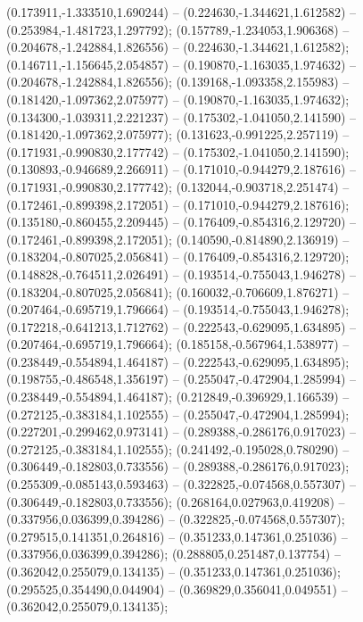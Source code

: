  (0.173911,-1.333510,1.690244) -- (0.224630,-1.344621,1.612582) -- (0.253984,-1.481723,1.297792);
 (0.157789,-1.234053,1.906368) -- (0.204678,-1.242884,1.826556) -- (0.224630,-1.344621,1.612582);
 (0.146711,-1.156645,2.054857) -- (0.190870,-1.163035,1.974632) -- (0.204678,-1.242884,1.826556);
 (0.139168,-1.093358,2.155983) -- (0.181420,-1.097362,2.075977) -- (0.190870,-1.163035,1.974632);
 (0.134300,-1.039311,2.221237) -- (0.175302,-1.041050,2.141590) -- (0.181420,-1.097362,2.075977);
 (0.131623,-0.991225,2.257119) -- (0.171931,-0.990830,2.177742) -- (0.175302,-1.041050,2.141590);
 (0.130893,-0.946689,2.266911) -- (0.171010,-0.944279,2.187616) -- (0.171931,-0.990830,2.177742);
 (0.132044,-0.903718,2.251474) -- (0.172461,-0.899398,2.172051) -- (0.171010,-0.944279,2.187616);
 (0.135180,-0.860455,2.209445) -- (0.176409,-0.854316,2.129720) -- (0.172461,-0.899398,2.172051);
 (0.140590,-0.814890,2.136919) -- (0.183204,-0.807025,2.056841) -- (0.176409,-0.854316,2.129720);
 (0.148828,-0.764511,2.026491) -- (0.193514,-0.755043,1.946278) -- (0.183204,-0.807025,2.056841);
 (0.160032,-0.706609,1.876271) -- (0.207464,-0.695719,1.796664) -- (0.193514,-0.755043,1.946278);
 (0.172218,-0.641213,1.712762) -- (0.222543,-0.629095,1.634895) -- (0.207464,-0.695719,1.796664);
 (0.185158,-0.567964,1.538977) -- (0.238449,-0.554894,1.464187) -- (0.222543,-0.629095,1.634895);
 (0.198755,-0.486548,1.356197) -- (0.255047,-0.472904,1.285994) -- (0.238449,-0.554894,1.464187);
 (0.212849,-0.396929,1.166539) -- (0.272125,-0.383184,1.102555) -- (0.255047,-0.472904,1.285994);
 (0.227201,-0.299462,0.973141) -- (0.289388,-0.286176,0.917023) -- (0.272125,-0.383184,1.102555);
 (0.241492,-0.195028,0.780290) -- (0.306449,-0.182803,0.733556) -- (0.289388,-0.286176,0.917023);
 (0.255309,-0.085143,0.593463) -- (0.322825,-0.074568,0.557307) -- (0.306449,-0.182803,0.733556);
 (0.268164,0.027963,0.419208) -- (0.337956,0.036399,0.394286) -- (0.322825,-0.074568,0.557307);
 (0.279515,0.141351,0.264816) -- (0.351233,0.147361,0.251036) -- (0.337956,0.036399,0.394286);
 (0.288805,0.251487,0.137754) -- (0.362042,0.255079,0.134135) -- (0.351233,0.147361,0.251036);
 (0.295525,0.354490,0.044904) -- (0.369829,0.356041,0.049551) -- (0.362042,0.255079,0.134135);
